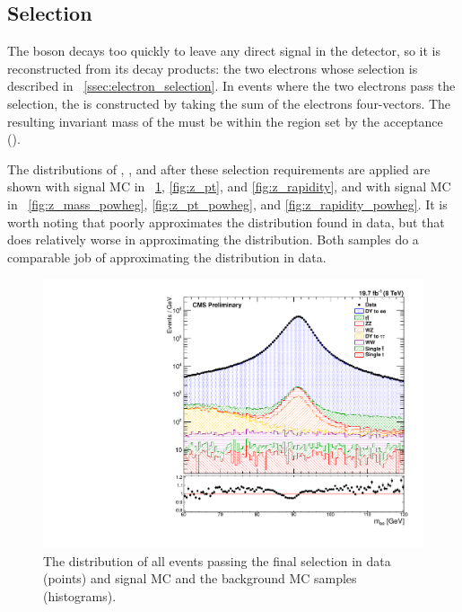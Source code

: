 \subsection{\Z Selection}

The \Z boson decays too quickly to leave any direct signal in the detector, so
it is reconstructed from its decay products: the two electrons whose selection
is described in \SEC~\ref{ssec:electron_selection}. In events where the two
electrons pass the selection, the \Z is constructed by taking the sum of the
electrons four-vectors. The resulting invariant mass of the \Z must be within
the region set by the acceptance (\MassRange).

The distributions of \mee, \Z \pt, and \Z \rapidity after these selection
requirements are applied are shown with \MADGRAPH signal MC in
\FIGS~\ref{fig:z_mass}, \ref{fig:z_pt}, and \ref{fig:z_rapidity}, and with
\POWHEG signal MC in \FIGS~\ref{fig:z_mass_powheg}, \ref{fig:z_pt_powheg}, and
\ref{fig:z_rapidity_powheg}. It is worth noting that \MADGRAPH poorly
approximates the \rapidity distribution found in data, but that \POWHEG does
relatively worse in approximating the \pt distribution. Both samples do a
comparable job of approximating the \mee distribution in data. 

\begin{figure}[!htbp]
    \centering
    \includegraphics[width=\textwidth]{figures/z_mass_fine.pdf}
    \caption[
        The \mee distribution of events in data and MC with \MADGRAPH signal MC.
    ]{
        The \mee distribution of all events passing the final selection in data
        (points) and \MADGRAPH signal MC and the background MC samples
        (histograms).
    }
    \label{fig:z_mass}
\end{figure}

